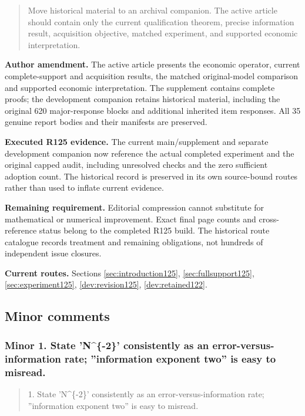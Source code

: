 \begin{quote}\small
Move historical material to an archival companion. The active article should contain only the current qualification theorem, precise information result, acquisition objective, matched experiment, and supported economic interpretation.
\end{quote}

\noindent\textbf{Author amendment.} The active article presents the economic operator, current complete-support and acquisition results, the matched original-model comparison and supported economic interpretation. The supplement contains complete proofs; the development companion retains historical material, including the original 620 major-response blocks and additional inherited item responses. All 35 genuine report bodies and their manifests are preserved.

\noindent\textbf{Executed R125 evidence.} The current main/supplement and separate development companion now reference the actual completed experiment and the original capped audit, including unresolved checks and the zero sufficient adoption count. The historical record is preserved in its own source-bound routes rather than used to inflate current evidence.

\noindent\textbf{Remaining requirement.} Editorial compression cannot substitute for mathematical or numerical improvement. Exact final page counts and cross-reference status belong to the completed R125 build. The historical route catalogue records treatment and remaining obligations, not hundreds of independent issue closures.

\noindent\textbf{Current routes.} Sections \ref{sec:introduction125}, \ref{sec:fullsupport125}, \ref{sec:experiment125}, \ref{dev:revision125}, \ref{dev:retained122}.

\subsection{Minor comments}

\subsubsection{Minor 1. State 'N\textasciicircum{}\{-2\}' consistently as an error-versus-information rate; ''information exponent two'' is easy to misread.}

\begin{quote}\small
1. State 'N\textasciicircum{}\{-2\}' consistently as an error-versus-information rate; ''information exponent two'' is easy to misread.
\end{quote}


